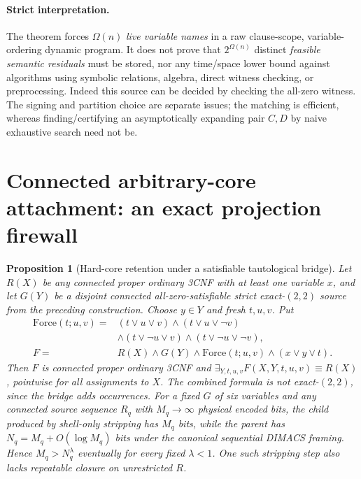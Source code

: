 \documentclass[11pt]{article}
\newtheorem{proposition}[theorem]{Proposition}
\begin{document}
\paragraph{Strict interpretation.} The theorem forces $\Omega(n)$ \emph{live variable names} in a raw clause-scope, variable-ordering dynamic program. It does not prove that $2^{\Omega(n)}$ distinct \emph{feasible semantic residuals} must be stored, nor any time/space lower bound against algorithms using symbolic relations, algebra, direct witness checking, or preprocessing. Indeed this source can be decided by checking the all-zero witness. The signing and partition choice are separate issues; the matching is efficient, whereas finding/certifying an asymptotically expanding pair $C,D$ by naive exhaustive search need not be.

\section{Connected arbitrary-core attachment: an exact projection firewall}
\begin{proposition}[Hard-core retention under a satisfiable tautological bridge]
Let $R(X)$ be any connected proper ordinary 3CNF with at least one variable $x$, and let $G(Y)$ be a disjoint connected all-zero-satisfiable strict exact-$(2,2)$ source from the preceding construction. Choose $y\in Y$ and fresh $t,u,v$. Put
\[
\begin{split}
\mathrm{Force}(t;u,v)= {} &(t\vee u\vee v)\wedge(t\vee u\vee\neg v)\\
&\wedge(t\vee\neg u\vee v)\wedge(t\vee\neg u\vee\neg v),\\
F={}&R(X)\wedge G(Y)\wedge\mathrm{Force}(t;u,v)
\wedge(x\vee y\vee t).
\end{split}
\]
Then $F$ is connected proper ordinary 3CNF and
$\exists_{Y,t,u,v}F(X,Y,t,u,v)\equiv R(X)$, pointwise for all assignments to $X$. The \emph{combined} formula is not exact-$(2,2)$, since the bridge adds occurrences.
For a fixed $G$ of six variables and any connected source sequence $R_q$ with $M_q\to\infty$ physical encoded bits, the child produced by \emph{shell-only stripping} has $M_q$ bits, while the parent has $N_q=M_q+O(\log M_q)$ bits under the canonical sequential DIMACS framing. Hence $M_q>N_q^\lambda$ eventually for every fixed $\lambda<1$. One such stripping step also lacks repeatable closure on unrestricted $R$.
\end{proposition}
\end{document}

